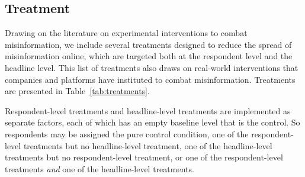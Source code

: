 \documentclass[letterpaper, 12pt, parskip=full,]{scrartcl}
\begin{document}
\subsection{Treatment}
Drawing on the literature on experimental interventions to combat misinformation, we include several treatments designed to reduce the spread of misinformation online, which are targeted both at the respondent level and the headline level. This list of treatments also draws on real-world interventions that companies and platforms have instituted to combat misinformation. Treatments are presented in Table~\ref{tab:treatments}. 

Respondent-level treatments and headline-level treatments are implemented as separate factors, each of which has an empty baseline level that is the control. So respondents may be assigned the pure control condition, one of the respondent-level treatments but no headline-level treatment, one of the headline-level treatments but no respondent-level treatment, or one of the respondent-level treatments \textit{and} one of the headline-level treatments. 
\end{document}
